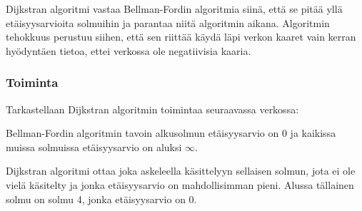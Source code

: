Dijkstran algoritmi vastaa
Bellman-Fordin algoritmia siinä,
että se pitää
yllä etäisyysarvioita solmuihin
ja parantaa niitä algoritmin aikana.
Algoritmin tehokkuus perustuu
siihen, että sen riittää käydä läpi
verkon kaaret vain kerran
hyödyntäen tietoa,
ettei verkossa ole negatiivisia kaaria.

\subsubsection{Toiminta}

Tarkastellaan Dijkstran algoritmin toimintaa
seuraavassa verkossa:
\begin{center}
\end{center}
Bellman-Fordin algoritmin tavoin
alkusolmun etäisyysarvio on 0
ja kaikissa muissa solmuissa etäisyysarvio
on aluksi $\infty$.

Dijkstran algoritmi
ottaa joka askeleella käsittelyyn
sellaisen solmun,
jota ei ole vielä käsitelty
ja jonka etäisyysarvio on
mahdollisimman pieni.
Alussa tällainen solmu on solmu 4,
jonka etäisyysarvio on 0.

